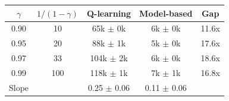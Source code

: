 \begin{tabular}{ccccc}
\toprule
$\gamma$ & $1/(1-\gamma)$ & Q-learning & Model-based & Gap \\
\midrule
0.90 & 10 & 65k $\pm$ 0k & 6k $\pm$ 0k & 11.6x \\
0.95 & 20 & 88k $\pm$ 1k & 5k $\pm$ 0k & 17.6x \\
0.97 & 33 & 104k $\pm$ 2k & 6k $\pm$ 0k & 18.6x \\
0.99 & 100 & 118k $\pm$ 1k & 7k $\pm$ 1k & 16.8x \\
\midrule
Slope & & 0.25 $\pm$ 0.06 & 0.11 $\pm$ 0.06 & \\
\bottomrule
\end{tabular}